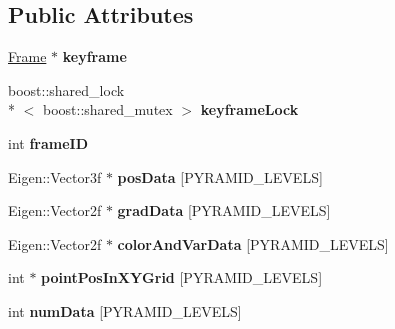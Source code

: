 \subsection*{Public Attributes}
\begin{DoxyCompactItemize}
\item 
\hypertarget{classlsd__slam_1_1_tracking_reference_a94f35da0e05ae9aca45340873aaedd2a}{\hyperlink{classlsd__slam_1_1_frame}{Frame} $\ast$ {\bfseries keyframe}}\label{classlsd__slam_1_1_tracking_reference_a94f35da0e05ae9aca45340873aaedd2a}

\item 
\hypertarget{classlsd__slam_1_1_tracking_reference_a2b6b9c6a539fa3a97104682842d09dd2}{boost\-::shared\-\_\-lock\\*
$<$ boost\-::shared\-\_\-mutex $>$ {\bfseries keyframe\-Lock}}\label{classlsd__slam_1_1_tracking_reference_a2b6b9c6a539fa3a97104682842d09dd2}

\item 
\hypertarget{classlsd__slam_1_1_tracking_reference_afc8f3d86399f94d2fa0ca3bcf07141fe}{int {\bfseries frame\-I\-D}}\label{classlsd__slam_1_1_tracking_reference_afc8f3d86399f94d2fa0ca3bcf07141fe}

\item 
\hypertarget{classlsd__slam_1_1_tracking_reference_ad3dc954bcb22fbe6bae2d4da09e02c70}{Eigen\-::\-Vector3f $\ast$ {\bfseries pos\-Data} \mbox{[}P\-Y\-R\-A\-M\-I\-D\-\_\-\-L\-E\-V\-E\-L\-S\mbox{]}}\label{classlsd__slam_1_1_tracking_reference_ad3dc954bcb22fbe6bae2d4da09e02c70}

\item 
\hypertarget{classlsd__slam_1_1_tracking_reference_ade7fa937bd39eabf18b5f864bccfaa53}{Eigen\-::\-Vector2f $\ast$ {\bfseries grad\-Data} \mbox{[}P\-Y\-R\-A\-M\-I\-D\-\_\-\-L\-E\-V\-E\-L\-S\mbox{]}}\label{classlsd__slam_1_1_tracking_reference_ade7fa937bd39eabf18b5f864bccfaa53}

\item 
\hypertarget{classlsd__slam_1_1_tracking_reference_a2bd89fcf42df9a019cbf0ca212cf2616}{Eigen\-::\-Vector2f $\ast$ {\bfseries color\-And\-Var\-Data} \mbox{[}P\-Y\-R\-A\-M\-I\-D\-\_\-\-L\-E\-V\-E\-L\-S\mbox{]}}\label{classlsd__slam_1_1_tracking_reference_a2bd89fcf42df9a019cbf0ca212cf2616}

\item 
\hypertarget{classlsd__slam_1_1_tracking_reference_a3873d2347cc25e6c9408f8696f04bd30}{int $\ast$ {\bfseries point\-Pos\-In\-X\-Y\-Grid} \mbox{[}P\-Y\-R\-A\-M\-I\-D\-\_\-\-L\-E\-V\-E\-L\-S\mbox{]}}\label{classlsd__slam_1_1_tracking_reference_a3873d2347cc25e6c9408f8696f04bd30}

\item 
\hypertarget{classlsd__slam_1_1_tracking_reference_a6d26c5de029ea949d13d7dc15f737b21}{int {\bfseries num\-Data} \mbox{[}P\-Y\-R\-A\-M\-I\-D\-\_\-\-L\-E\-V\-E\-L\-S\mbox{]}}\label{classlsd__slam_1_1_tracking_reference_a6d26c5de029ea949d13d7dc15f737b21}

\end{DoxyCompactItemize}


